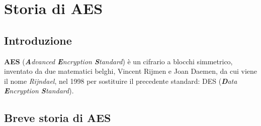 
\chapter{Storia di AES}





\section{Introduzione}


  

\textsf{\small \textbf{AES} (\emph{\textbf{A}dvanced \textbf{E}ncryption \textbf{S}tandard}) è un cifrario a blocchi simmetrico, inventato da due matematici belghi, Vincent Rijmen e Joan Daemen, da cui viene il nome \emph{Rijndael}, nel 1998 per sostituire il precedente standard: DES (\emph{\textbf{D}ata \textbf{E}ncryption \textbf{S}tandard}).}




\section{Breve storia di AES} 

